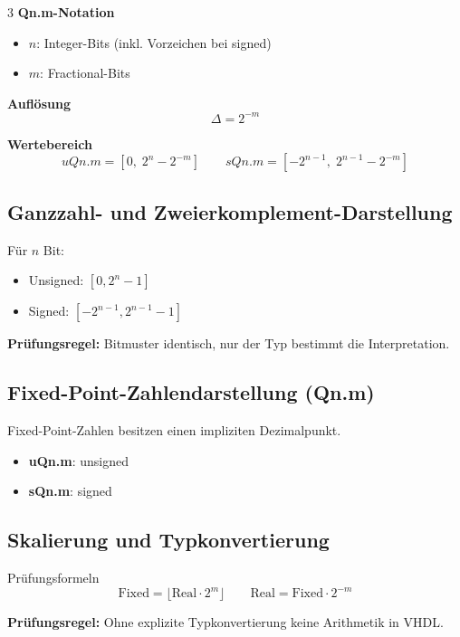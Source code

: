 \documentclass[10pt,a4paper]{article}
\newcommand{\hilite}[1]{\colorbox{yellow!25}{#1}}
\newcommand{\imp}[1]{\textbf{\textcolor{codeemph}{#1}}}
\begin{document}
\begin{multicols}{3}
\textbf{Qn.m-Notation}
\begin{itemize}
  \item $n$: Integer-Bits (inkl. Vorzeichen bei signed)
  \item $m$: Fractional-Bits
\end{itemize}

\textbf{Auflösung}
\[
\Delta = 2^{-m}
\]

\textbf{Wertebereich}
\[
uQn.m = [0,\; 2^n - 2^{-m}]
\qquad
sQn.m = [-2^{n-1},\; 2^{n-1} - 2^{-m}]
\]


\subsection{Ganzzahl- und Zweierkomplement-Darstellung}

Für $n$ Bit:
\begin{itemize}
  \item Unsigned: $[0, 2^n - 1]$
  \item Signed: $[-2^{n-1}, 2^{n-1}-1]$
\end{itemize}

\imp{Prüfungsregel:}  
\hilite{Bitmuster identisch}, nur der \hilite{Typ} bestimmt die Interpretation.


\subsection{Fixed-Point-Zahlendarstellung (Qn.m)}
Fixed-Point-Zahlen besitzen einen impliziten Dezimalpunkt.

\begin{itemize}
  \item \textbf{uQn.m}: unsigned
  \item \textbf{sQn.m}: signed
\end{itemize}


\subsection{Skalierung und Typkonvertierung}

\textcolor{codeemph}{Prüfungsformeln}
\[
\text{Fixed} = \lfloor \text{Real} \cdot 2^m \rfloor
\qquad
\text{Real} = \text{Fixed} \cdot 2^{-m}
\]

\imp{Prüfungsregel:}  
Ohne \hilite{explizite Typkonvertierung} keine \hilite{Arithmetik} in VHDL.


\end{multicols}
\end{document}
